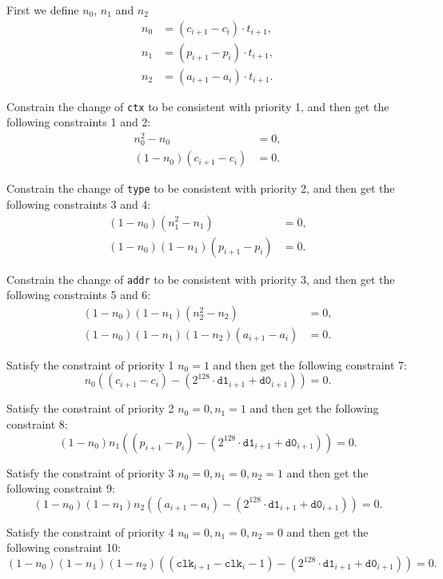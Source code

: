 First we define $n_0$, $n_1$ and $n_2$
\begin{align*}
    n_0 &= (c_{i+1} - c_i) \cdot t_{i+1}, \\
    n_1 &= (p_{i+1} - p_i) \cdot t_{i+1}, \\
    n_2 &= (a_{i+1} - a_i) \cdot t_{i+1}.
\end{align*}

Constrain the change of \verb|ctx| to be consistent with priority 1, and then get the following constraints 1 and 2:
\begin{align*}
    n_0^2 - n_0 &= 0, \\
    (1-n_0)(c_{i+1}-c_i) &= 0.
\end{align*}

Constrain the change of \verb|type| to be consistent with priority 2, and then get the following constraints 3 and 4:
\begin{align*}
    (1-n_0)(n_1^2-n_1) &= 0, \\
    (1-n_0)(1-n_1)(p_{i+1}-p_i) &= 0.
\end{align*}

Constrain the change of \verb|addr| to be consistent with priority 3, and then get the following constraints 5 and 6:
\begin{align*}
    (1-n_0)(1-n_1)(n_2^2-n_2) &= 0, \\
    (1-n_0)(1-n_1)(1-n_2)(a_{i+1}-a_i) &= 0.
\end{align*}

Satisfy the constraint of priority 1 $n_0=1$ and then get the following constraint 7:
\begin{equation*}
    n_0 \left( (c_{i+1}-c_i) - (2^{128} \cdot \texttt{d1}_{i+1} + \texttt{d0}_{i+1}) \right) = 0.
\end{equation*}

Satisfy the constraint of priority 2 $n_0=0, n_1=1$ and then get the following constraint 8:
\begin{equation*}
    (1-n_0)n_1 \left( (p_{i+1}-p_i) - (2^{128} \cdot \texttt{d1}_{i+1} + \texttt{d0}_{i+1}) \right) = 0.
\end{equation*}

Satisfy the constraint of priority 3 $n_0=0, n_1=0, n_2=1$ and then get the following constraint 9:
\begin{equation*}
    (1-n_0)(1-n_1)n_2 \left( (a_{i+1}-a_i) - (2^{128} \cdot \texttt{d1}_{i+1} + \texttt{d0}_{i+1}) \right) = 0.
\end{equation*}

Satisfy the constraint of priority 4 $n_0=0, n_1=0, n_2=0$ and then get the following constraint 10:
\begin{equation*}
    (1-n_0)(1-n_1)(1-n_2) \left( (\texttt{clk}_{i+1}-\texttt{clk}_i-1) - (2^{128} \cdot \texttt{d1}_{i+1} + \texttt{d0}_{i+1}) \right) = 0.
\end{equation*}

